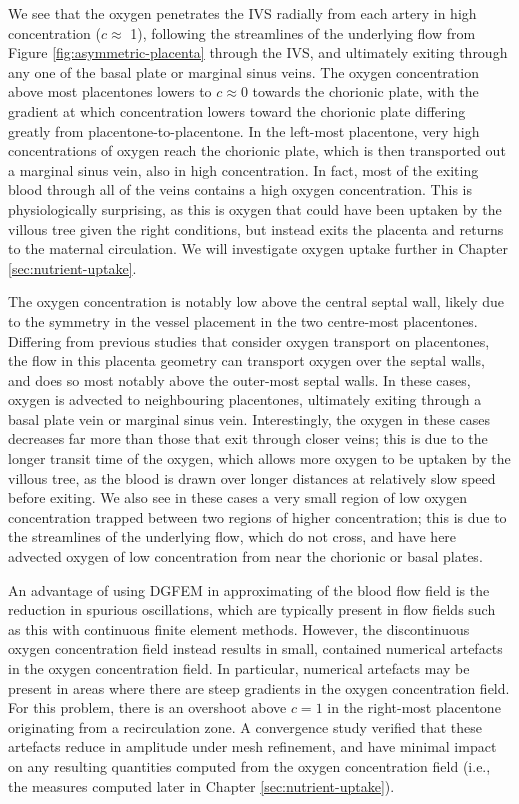         We see that the oxygen penetrates the IVS radially from each artery in high concentration ($c \approx $ 1), following the streamlines of the underlying flow from Figure \ref{fig:asymmetric-placenta} through the IVS, and ultimately exiting through any one of the basal plate or marginal sinus veins. The oxygen concentration above most placentones lowers to $c \approx 0$ towards the chorionic plate, with the gradient at which concentration lowers toward the chorionic plate differing greatly from placentone-to-placentone. In the left-most placentone, very high concentrations of oxygen reach the chorionic plate, which is then transported out a marginal sinus vein, also in high concentration. In fact, most of the exiting blood through all of the veins contains a high oxygen concentration. This is physiologically surprising, as this is oxygen that could have been uptaken by the villous tree given the right conditions, but instead exits the placenta and returns to the maternal circulation. We will investigate oxygen uptake further in Chapter \ref{sec:nutrient-uptake}.

        The oxygen concentration is notably low above the central septal wall, likely due to the symmetry in the vessel placement in the two centre-most placentones. Differing from previous studies that consider oxygen transport on placentones, the flow in this placenta geometry can transport oxygen over the septal walls, and does so most notably above the outer-most septal walls. In these cases, oxygen is advected to neighbouring placentones, ultimately exiting through a basal plate vein or marginal sinus vein. Interestingly, the oxygen in these cases decreases far more than those that exit through closer veins; this is due to the longer transit time of the oxygen, which allows more oxygen to be uptaken by the villous tree, as the blood is drawn over longer distances at relatively slow speed before exiting. We also see in these cases a very small region of low oxygen concentration trapped between two regions of higher concentration; this is due to the streamlines of the underlying flow, which do not cross, and have here advected oxygen of low concentration from near the chorionic or basal plates. 

        An advantage of using DGFEM in approximating of the blood flow field is the reduction in spurious oscillations, which are typically present in flow fields such as this with continuous finite element methods. However, the discontinuous oxygen concentration field instead results in small, contained numerical artefacts in the oxygen concentration field. In particular, numerical artefacts may be present in areas where there are steep gradients in the oxygen concentration field. For this problem, there is an overshoot above $c = 1$ in the right-most placentone originating from a recirculation zone. A convergence study verified that these artefacts reduce in amplitude under mesh refinement, and have minimal impact on any resulting quantities computed from the oxygen concentration field (i.e., the measures computed later in Chapter \ref{sec:nutrient-uptake}).
        
